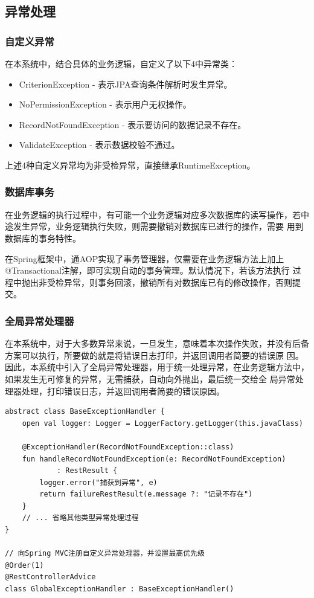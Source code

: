 \documentclass[titlepage,UTF8,linespread=1.5]{ctexart}
\begin{document}
\subsection{异常处理}
\subsubsection{自定义异常}
在本系统中，结合具体的业务逻辑，自定义了以下4中异常类：
\begin{itemize}
    \item CriterionException - 表示JPA查询条件解析时发生异常。
    \item NoPermissionException - 表示用户无权操作。
    \item RecordNotFoundException - 表示要访问的数据记录不存在。
    \item ValidateException - 表示数据校验不通过。
\end{itemize}\par
上述4种自定义异常均为非受检异常，直接继承RuntimeException。
\subsubsection{数据库事务}
在业务逻辑的执行过程中，有可能一个业务逻辑对应多次数据库的读写操作，若中途发生异常，业务逻辑执行失败，则需要撤销对数据库已进行的操作，需要
用到数据库的事务特性。\par
在Spring框架中，通AOP实现了事务管理器，仅需要在业务逻辑方法上加上@Transactional注解，即可实现自动的事务管理。默认情况下，若该方法执行
过程中抛出非受检异常，则事务回滚，撤销所有对数据库已有的修改操作，否则提交。\par
\subsubsection{全局异常处理器}
在本系统中，对于大多数异常来说，一旦发生，意味着本次操作失败，并没有后备方案可以执行，所要做的就是将错误日志打印，并返回调用者简要的错误原
因。因此，本系统中引入了全局异常处理器，用于统一处理异常，在业务逻辑方法中，如果发生无可修复的异常，无需捕获，自动向外抛出，最后统一交给全
局异常处理器处理，打印错误日志，并返回调用者简要的错误原因。\par
\begin{mdframed}\begin{verbatim}
abstract class BaseExceptionHandler {
    open val logger: Logger = LoggerFactory.getLogger(this.javaClass)

    @ExceptionHandler(RecordNotFoundException::class)
    fun handleRecordNotFoundException(e: RecordNotFoundException)
            : RestResult {
        logger.error("捕获到异常", e)
        return failureRestResult(e.message ?: "记录不存在")
    }
    // ... 省略其他类型异常处理过程
}

// 向Spring MVC注册自定义异常处理器，并设置最高优先级
@Order(1)
@RestControllerAdvice
class GlobalExceptionHandler : BaseExceptionHandler()
\end{verbatim}\end{mdframed}\par
\end{document}
